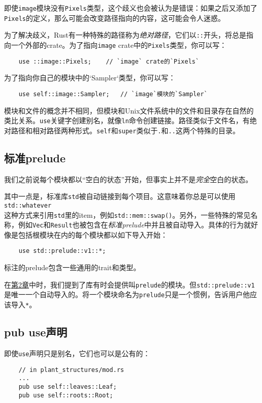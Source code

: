 即使\texttt{image}模块没有\texttt{Pixels}类型，这个歧义也会被认为是错误：如果之后又添加了\texttt{Pixels}的定义，那么可能会改变路径指向的内容，这可能会令人迷惑。

为了解决歧义，Rust有一种特殊的路径称为\emph{绝对路径}，它们以\texttt{::}开头，将总是指向一个外部的crate。为了指向\texttt{image} crate中的\texttt{Pixels}类型，你可以写：
\begin{verbatim}
    use ::image::Pixels;    // `image` crate的`Pixels`
\end{verbatim}

为了指向你自己的模块中的`Sampler`类型，你可以写：
\begin{verbatim}
    use self::image::Sampler;   // `image`模块的`Sampler`
\end{verbatim}

模块和文件的概念并不相同，但模块和Unix文件系统中的文件和目录存在自然的类比关系。\texttt{use}关键字创建别名，就像\texttt{ln}命令创建链接。路径类似于文件名，有绝对路径和相对路径两种形式。\texttt{self}和\texttt{super}类似于\texttt{.}和\texttt{..}这两个特殊的目录。

\subsection{标准prelude}
我们之前说每个模块都以“空白的状态”开始，但事实上并不是\emph{完全}空白的状态。

其中一点是，标准库\texttt{std}被自动链接到每个项目。这意味着你总是可以使用\texttt{std::whatever}\\
这种方式来引用\texttt{std}里的item，例如\texttt{std::mem::swap()}。另外，一些特殊的常见名称，例如\texttt{Vec}和\texttt{Result}也被包含在\emph{标准prelude}中并且被自动导入。具体的行为就好像是包括根模块在内的每个模块都以如下导入开始：
\begin{verbatim}
    use std::prelude::v1::*;
\end{verbatim}

标注的prelude包含一些通用的trait和类型。

在\hyperref[ch02]{第2章}中时，我们提到了库有时会提供叫\texttt{prelude}的模块。但\texttt{std::prelude::v1}是唯一一个自动导入的。将一个模块命名为\texttt{prelude}只是一个惯例，告诉用户他应该导入\texttt{*}。

\subsection{pub use声明}
即使\texttt{use}声明只是别名，它们也可以是公有的：
\begin{verbatim}
    // in plant_structures/mod.rs
    ...
    pub use self::leaves::Leaf;
    pub use self::roots::Root;
\end{verbatim}

